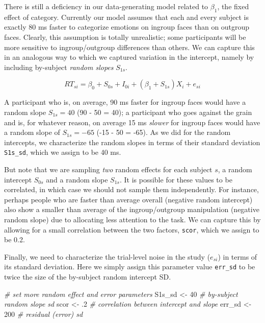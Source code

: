 \documentclass[man,floatsintext]{apa6}
\newenvironment{Shaded}{\begin{snugshade}}{\end{snugshade}}
\newcommand{\CommentTok}[1]{\textcolor[rgb]{0.56,0.35,0.01}{\textit{#1}}}
\newcommand{\DecValTok}[1]{\textcolor[rgb]{0.00,0.00,0.81}{#1}}
\newcommand{\FloatTok}[1]{\textcolor[rgb]{0.00,0.00,0.81}{#1}}
\newcommand{\NormalTok}[1]{#1}
\newcommand{\StringTok}[1]{\textcolor[rgb]{0.31,0.60,0.02}{#1}}
\begin{document}
There is still a deficiency in our data-generating model related to \(\beta_1\), the fixed effect of category. Currently our model assumes that each and every subject is exactly 80 ms faster to categorize emotions on ingroup faces than on outgroup faces. Clearly, this assumption is totally unrealistic; some participants will be more sensitive to ingroup/outgroup differences than others. We can capture this in an analogous way to which we captured variation in the intercept, namely by including by-subject \emph{random slopes} \(S_{1s}\).

\begin{equation}
RT_{si} = \beta_0 + S_{0s} + I_{0i} + \left(\beta_1 + S_{1s}\right) X_i + e_{si}
\end{equation}

A participant who is, on average, 90 ms faster for ingroup faces would have a random slope \(S_{1s} = 40\) (90 - 50 = 40); a participant who goes against the grain and is, for whatever reason, on average 15 ms \emph{slower} for ingroup faces would have a random slope of \(S_{1s} = -65\) (-15 - 50 = -65). As we did for the random intercepts, we characterize the random slopes in terms of their standard deviation \texttt{S1s\_sd}, which we assign to be 40 ms.

But note that we are sampling \emph{two} random effects for each subject \(s\), a random intercept \(S_{0s}\) and a random slope \(S_{1s}\). It is possible for these values to be correlated, in which case we should not sample them independently. For instance, perhaps people who are faster than average overall (negative random intercept) also show a smaller than average of the ingroup/outgroup manipulation (negative random slope) due to allocating less attention to the task. We can capture this by allowing for a small correlation between the two factors, \texttt{scor}, which we assign to be 0.2.

Finally, we need to characterize the trial-level noise in the study (\(e_{si}\)) in terms of its standard deviation. Here we simply assign this parameter value \texttt{err\_sd} to be twice the size of the by-subject random intercept SD.

\begin{Shaded}
\begin{Highlighting}[]
\CommentTok{# set more random effect and error parameters}
\NormalTok{S1s_sd <-}\StringTok{  }\DecValTok{40} \CommentTok{# by-subject random slope sd}
\NormalTok{scor   <-}\StringTok{  }\FloatTok{.2} \CommentTok{# correlation between intercept and slope}
\NormalTok{err_sd <-}\StringTok{ }\DecValTok{200} \CommentTok{# residual (error) sd}
\end{Highlighting}
\end{Shaded}
\end{document}
